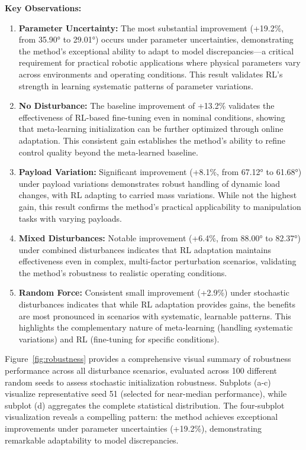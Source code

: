 \documentclass[a4paper]{cas-sc}
\begin{document}
\textbf{Key Observations:}

\begin{enumerate}
    \item \textbf{Parameter Uncertainty:} The most substantial improvement (+19.2\%, from 35.90° to 29.01°) occurs under parameter uncertainties, demonstrating the method's exceptional ability to adapt to model discrepancies—a critical requirement for practical robotic applications where physical parameters vary across environments and operating conditions. This result validates RL's strength in learning systematic patterns of parameter variations.
    
    \item \textbf{No Disturbance:} The baseline improvement of +13.2\% validates the effectiveness of RL-based fine-tuning even in nominal conditions, showing that meta-learning initialization can be further optimized through online adaptation. This consistent gain establishes the method's ability to refine control quality beyond the meta-learned baseline.
    
    \item \textbf{Payload Variation:} Significant improvement (+8.1\%, from 67.12° to 61.68°) under payload variations demonstrates robust handling of dynamic load changes, with RL adapting to carried mass variations. While not the highest gain, this result confirms the method's practical applicability to manipulation tasks with varying payloads.
    
    \item \textbf{Mixed Disturbances:} Notable improvement (+6.4\%, from 88.00° to 82.37°) under combined disturbances indicates that RL adaptation maintains effectiveness even in complex, multi-factor perturbation scenarios, validating the method's robustness to realistic operating conditions.
    
    \item \textbf{Random Force:} Consistent small improvement (+2.9\%) under stochastic disturbances indicates that while RL adaptation provides gains, the benefits are most pronounced in scenarios with systematic, learnable patterns. This highlights the complementary nature of meta-learning (handling systematic variations) and RL (fine-tuning for specific conditions).
\end{enumerate}

Figure~\ref{fig:robustness} provides a comprehensive visual summary of robustness performance across all disturbance scenarios, evaluated across 100 different random seeds to assess stochastic initialization robustness. Subplots (a-c) visualize representative seed 51 (selected for near-median performance), while subplot (d) aggregates the complete statistical distribution. The four-subplot visualization reveals a compelling pattern: the method achieves exceptional improvements under parameter uncertainties (+19.2\%), demonstrating remarkable adaptability to model discrepancies. 
\end{document}
